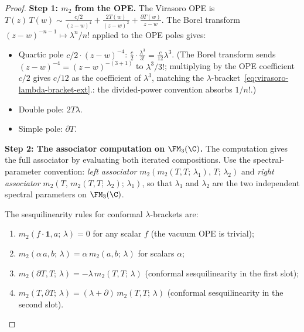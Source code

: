 \begin{proof}
\textbf{Step 1: $m_2$ from the OPE.}
The Virasoro OPE is
$T(z)\, T(w) \sim \frac{c/2}{(z-w)^4} +
\frac{2T(w)}{(z-w)^2} + \frac{\partial T(w)}{z-w}$.
The Borel transform $(z-w)^{-n-1} \mapsto \lambda^n/n!$
applied to the OPE poles gives:
\begin{itemize}
\item Quartic pole $c/2 \cdot (z-w)^{-4}$:
 $\frac{c}{2} \cdot \frac{\lambda^3}{3!}
 = \frac{c}{12}\lambda^3$.
 (The Borel transform sends $(z{-}w)^{-4} = (z{-}w)^{-(3+1)}$
 to $\lambda^3/3!$; multiplying by the OPE coefficient $c/2$
 gives $c/12$ as the coefficient of $\lambda^3$,
 matching the
 $\lambda$-bracket~\eqref{eq:virasoro-lambda-bracket-ext}.: the divided-power convention absorbs $1/n!$.)
\item Double pole: $2T\lambda$.
\item Simple pole: $\partial T$.
\end{itemize}

\medskip
\textbf{Step 2: The associator computation on $\FM_3(\C)$.}
The computation gives the full associator by evaluating both iterated
compositions. Use the spectral-parameter convention:
\emph{left associator}
$m_2(m_2(T,T;\,\lambda_1),\, T;\, \lambda_2)$ and
\emph{right associator}
$m_2(T,\, m_2(T,T;\,\lambda_2);\, \lambda_1)$, so that
$\lambda_1$ and $\lambda_2$ are the two independent spectral
parameters on $\FM_3(\C)$.

The sesquilinearity rules for conformal
$\lambda$-brackets are:
\begin{enumerate}[label=(\alph*)]
\item $m_2(f\!\cdot\!\mathbf{1}, a;\, \lambda) = 0$
 for any scalar $f$ (the vacuum OPE is trivial);
\item $m_2(\alpha\, a, b;\, \lambda)
 = \alpha\, m_2(a,b;\,\lambda)$ for scalars $\alpha$;
\item $m_2(\partial T, T;\,\lambda)
 = -\lambda\, m_2(T,T;\,\lambda)$
 (conformal sesquilinearity in the first slot);
\item $m_2(T, \partial T;\, \lambda)
 = (\lambda + \partial)\, m_2(T,T;\,\lambda)$
 (conformal sesquilinearity in the second slot).
\end{enumerate}


\end{proof}
